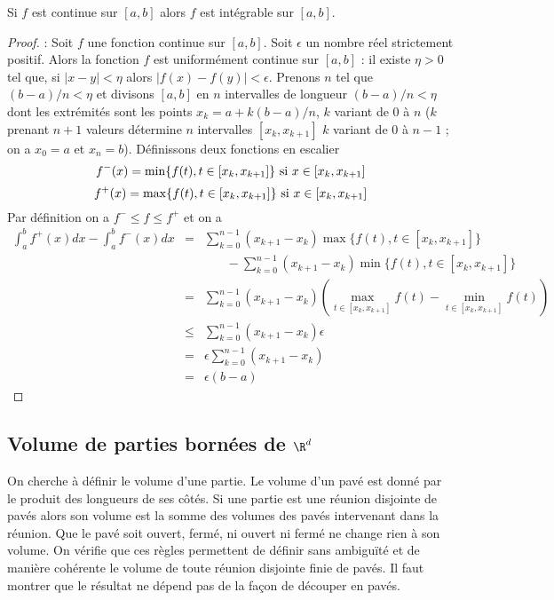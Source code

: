 \documentclass[12pt, class=report,crop=false]{standalone}
\begin{document}
{{\begin{theoreme}
Si $f$ est continue sur $[a,b]$ alors $f$ est intégrable sur $[a,b]$.
\end{theoreme}
\begin{proof} \rm : Soit $f$ une fonction continue sur $[a,b]$. Soit $\epsilon$ un nombre réel strictement positif. Alors la fonction $f$ est uniformément continue sur $[a,b]$ : il existe $\eta>0$ tel que, si $|x-y|<\eta$ alors $|f(x)-f(y)|<\epsilon$. Prenons $n$ tel que $(b-a)/n<\eta$ et divisons $[a,b]$ en $n$ intervalles de longueur $(b-a)/n<\eta$ dont les extrémités sont les points $x_k=a+k(b-a)/n$, $k$ variant de 0 \`a $n$ ($k$ prenant $n+1$ valeurs détermine $n$ intervalles $[x_k,x_{k+1}]$ $k$ variant de $0$ \`a $n-1$ ; on a $x_0=a$ et $x_n=b$). Définissons deux fonctions en escalier
$$
f^-(x)=\min\{f(t),t\in[x_k,x_{k+1}]\}\ {\rm si}\  x\in [x_k,x_{k+1}]
$$
$$
f^+(x)=\max\{f(t),t\in[x_k,x_{k+1}]\}\ {\rm si}\ x\in [x_k,x_{k+1}]
$$
Par définition on a $f^-\leq f\leq f^+$ et on a
\begin{eqnarray*}
\int_a^bf^+(x)dx-\int_a^bf^-(x)dx&=&\sum_{k=0}^{n-1}(x_{k+1}-x_k)\max\{f(t),t\in[x_k,x_{k+1}]\}\\
& & \ \ \ \ \ \ \ \ -\sum_{k=0}^{n-1}(x_{k+1}-x_k)\min\{f(t),t\in[x_k,x_{k+1}]\}\\
&=&\sum_{k=0}^{n-1}(x_{k+1}-x_k)(\max_{t\in[x_k,x_{k+1}]}f(t)-\min_{t\in[x_k,x_{k+1}]}f(t))\\
&\leq&\sum_{k=0}^{n-1}(x_{k+1}-x_k)\epsilon\\
&=&\epsilon \sum_{k=0}^{n-1}(x_{k+1}-x_k)\\
&=&\epsilon(b-a)
\end{eqnarray*}
\end{proof}

\subsection{Volume de parties bornées de $\R^d$}
On cherche \`a définir le volume d'une partie. Le volume d'un pavé est donné par le produit des longueurs de ses c\^otés.
Si une partie est une réunion disjointe de pavés alors son volume est la somme des volumes des pavés intervenant dans la réunion.
Que le pavé soit ouvert, fermé, ni ouvert ni fermé ne change rien \`a son volume.
On vérifie que ces r\`egles permettent de définir sans ambiguïté et de mani\`ere cohérente le volume de toute réunion disjointe finie de pavés. Il faut montrer que le résultat ne dépend pas de la fa\c con de découper en pavés.

}}
\end{document}
